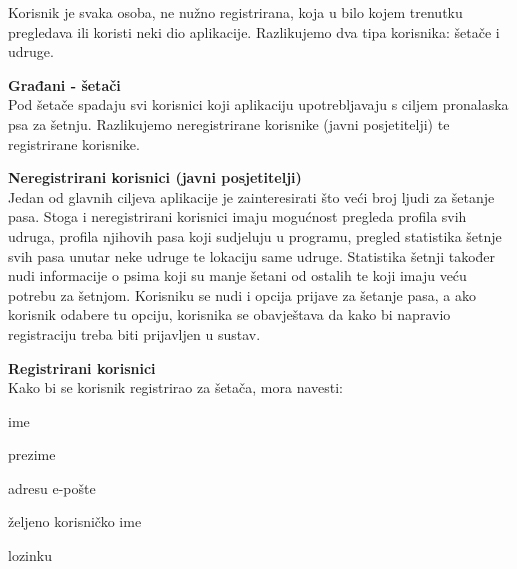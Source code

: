         Korisnik je svaka osoba, ne nužno registrirana, koja u bilo kojem trenutku pregledava ili koristi neki dio aplikacije. Razlikujemo dva tipa korisnika: šetače i udruge.
        \begin{packed_item}
            \item[1)] \textbf{Građani - šetači} \\
            Pod šetače spadaju svi korisnici koji aplikaciju upotrebljavaju s ciljem pronalaska psa za šetnju. Razlikujemo neregistrirane korisnike (javni posjetitelji) te registrirane korisnike.
            \begin{packed_item}
                        \item[a)] \textbf{Neregistrirani korisnici (javni posjetitelji)}\\
                        Jedan od glavnih ciljeva aplikacije je zainteresirati što veći broj ljudi za šetanje pasa. Stoga i neregistrirani korisnici imaju mogućnost pregleda profila svih udruga, profila njihovih pasa koji sudjeluju u programu, pregled statistika šetnje svih pasa unutar neke udruge te lokaciju same udruge. Statistika šetnji također nudi informacije o psima koji su manje šetani od ostalih te koji imaju veću potrebu za šetnjom. Korisniku se nudi i opcija prijave za šetanje pasa, a ako korisnik odabere tu opciju, korisnika se obavještava da kako bi napravio registraciju treba biti prijavljen u sustav.
            
                        \item[b)] \textbf{Registrirani korisnici} \\
                        Kako bi se korisnik registrirao za šetača, mora navesti:
                        \begin{packed_item}
                            \item[$\bullet$] ime
                            \item[$\bullet$] prezime
                            \item[$\bullet$] adresu e-pošte
                            \item[$\bullet$] željeno korisničko ime
                            \item[$\bullet$] lozinku
                        \end{packed_item}
                        

\end{packed_item}
\end{packed_item}

